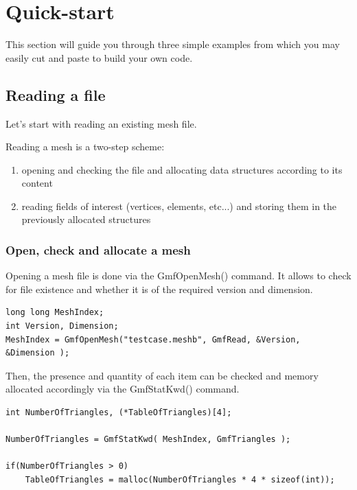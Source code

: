 \documentclass[a4paper,12pt]{article}
\begin{document}
%
%

\section{Quick-start}

This section will guide you through three simple examples from which you may easily cut and paste to build your own code.

\subsection{Reading a file}

Let's start with reading an existing mesh file.

Reading a mesh is a two-step scheme:

\begin{enumerate}
\item opening and checking the file and allocating data structures according to its content
\item reading fields of interest (vertices, elements, etc...) and storing them in the previously allocated structures
\end{enumerate}

\subsubsection{Open, check and allocate a mesh}

Opening a mesh file is done via the GmfOpenMesh() command. It allows to check for file existence and whether it is of the required version and dimension.

\begin{tt}
\begin{verbatim}
long long MeshIndex;
int Version, Dimension;
MeshIndex = GmfOpenMesh("testcase.meshb", GmfRead, &Version, &Dimension );
\end{verbatim}
\end{tt}
\normalfont

Then, the presence and quantity of each item can be checked and memory allocated accordingly via the GmfStatKwd() command.

\begin{tt}
\begin{verbatim}
int NumberOfTriangles, (*TableOfTriangles)[4];

NumberOfTriangles = GmfStatKwd( MeshIndex, GmfTriangles );

if(NumberOfTriangles > 0)
    TableOfTriangles = malloc(NumberOfTriangles * 4 * sizeof(int));
\end{verbatim}
\end{tt}
\normalfont
\end{document}
